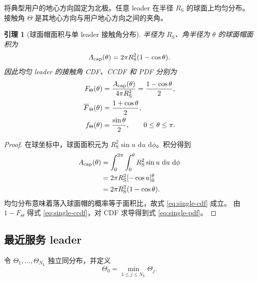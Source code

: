 \documentclass[UTF8,a4paper,11pt]{ctexart}
\newtheorem{lemma}{引理}[section]
\newcommand{\dd}{\,\mathrm d}
\newcommand{\NL}{N_{\mathrm L}}
\newcommand{\Rsat}{R_{\mathrm S}}
\begin{document}
将典型用户的地心方向固定为北极。任意 leader 在半径 $\Rsat$ 的球面上均匀分布。接触角
$\Theta$ 是其地心方向与用户地心方向之间的夹角。

\begin{lemma}[球面帽面积与单 leader 接触角分布]
半径为 $\Rsat$、角半径为 $\theta$ 的球面帽面积为
\begin{equation}
 A_{\rm cap}(\theta)=2\pi\Rsat^2(1-\cos\theta).
 \label{eq:cap-area}
\end{equation}
因此均匀 leader 的接触角 CDF、CCDF 和 PDF 分别为
\begin{align}
 F_{\Theta}(\theta)
 &=\frac{A_{\rm cap}(\theta)}{4\pi\Rsat^2}
 =\frac{1-\cos\theta}{2},\label{eq:single-cdf}\\
 \overline F_{\Theta}(\theta)
 &=\frac{1+\cos\theta}{2},\label{eq:single-ccdf}\\
 f_{\Theta}(\theta)
 &=\frac{\sin\theta}{2},\qquad 0\leq\theta\leq\pi.
 \label{eq:single-pdf}
\end{align}
\end{lemma}

\begin{proof}
在球坐标中，球面面积元为 $\Rsat^2\sin u\,\dd u\,\dd\phi$。积分得到
\begin{equation}
\begin{split}
 A_{\rm cap}(\theta)
 &=\int_0^{2\pi}\int_0^\theta
 \Rsat^2\sin u\,\dd u\,\dd\phi\\
 &=2\pi\Rsat^2[-\cos u]_0^\theta\\
 &=2\pi\Rsat^2(1-\cos\theta).
\end{split}
\end{equation}
均匀分布意味着落入球面帽的概率等于面积比，故式 \eqref{eq:single-cdf} 成立。
由 $1-F_{\Theta}$ 得式 \eqref{eq:single-ccdf}，对 CDF 求导得到式
\eqref{eq:single-pdf}。
\end{proof}

\subsection{最近服务 leader}

令 $\Theta_1,\ldots,\Theta_{\NL}$ 独立同分布，并定义
\begin{equation}
 \Theta_0=\min_{1\leq j\leq\NL}\Theta_j.
 \label{eq:nearest-angle}
\end{equation}
\end{document}
